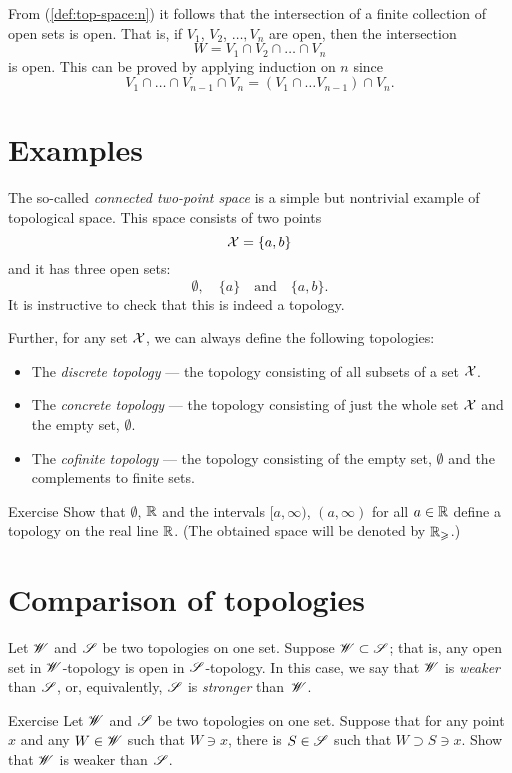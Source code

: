From (\ref{def:top-space:n}) it follows that the intersection of a finite collection of open sets is open.
That is, if $V_1$, $V_2$, $\dots, V_n$ are open, then the intersection 
\[W=V_1 \cap V_2\cap\dots\cap V_n\] is open.
This can be proved by applying induction on $n$ since 
\[V_1 \cap \dots\cap V_{n-1}\cap V_n=(V_1 \cap \dots V_{n-1})\cap V_n.\]

\section{Examples}

The so-called \emph{connected two-point space} is a simple but nontrivial example of topological space.
This space consists of two points 
\[\mathcal{X}=\{a,b\}\]
and it has three open sets: 
\[\emptyset,\quad \{a\}\quad\text{and}\quad\{a,b\}.\]
It is instructive to check that this is indeed a topology.

Further, for any set $\mathcal{X}$, we can always define the following topologies:
\begin{itemize} 
\item  The \emph{discrete topology} --- the topology consisting of all subsets of a set $\mathcal{X}$.
\item  The \emph{concrete topology}  --- the topology consisting of just the whole set $\mathcal{X}$ and the empty set, $\emptyset$.
\item  The \emph{cofinite topology} --- the topology consisting of the empty set, $\emptyset$ and the complements to finite sets.
\end{itemize}

\begin{thm}{Exercise}\label{ex:Rge}
Show that $\emptyset$, $\mathbb{R}$ and the intervals $[a,\infty)$, $(a,\infty)$ for all $a\in\mathbb{R}$ define a topology on the real line $\mathbb{R}$.
(The obtained space will be denoted by $\mathbb{R}_\geqslant$.)
\end{thm}

\section{Comparison of topologies}

Let $\mathscr{W}$ and $\mathscr{S}$ be two topologies on one set.
Suppose $\mathscr{W}\subset\mathscr{S}$; that is, any open set in $\mathscr{W}$-topology is open in $\mathscr{S}$-topology.
In this case, we say that $\mathscr{W}$ is \emph{weaker} than $\mathscr{S}$, or, equivalently, $\mathscr{S}$ is \emph{stronger} than~$\mathscr{W}$.

\begin{thm}{Exercise}
Let $\mathscr{W}$ and $\mathscr{S}$ be two topologies on one set.
Suppose that for any point $x$ and any $W\in\mathscr{W}$ such that $W\ni x$, there is $S\in \mathscr{S}$ such that 
$W\supset S\ni x$.
Show that $\mathscr{W}$ is weaker than $\mathscr{S}$.
\end{thm}



